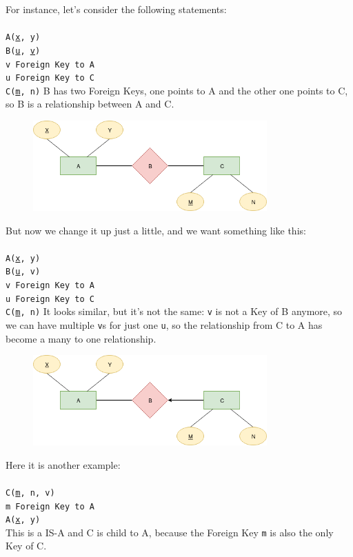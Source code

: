 \documentclass[class=book, crop=false, oneside]{standalone}
\newcommand\tab[1][1cm]{\hspace*{#1}}
\begin{document}
For instance, let's consider the following statements:\\\\
\texttt{A(\underline{x}, y)}\\
\texttt{B(\underline{u}, \underline{v})}\\
\tab[.4cm] \texttt{v Foreign Key to A}\\
\tab[.4cm] \texttt{u Foreign Key to C}\\
\texttt{C(\underline{m}, n)}
\vskip 5pt
B has two Foreign Keys, one points to A and the other one points to C, so B is a relationship between A and C.
\begin{figure}[H]
	\includegraphics[width=0.8\textwidth,keepaspectratio]{diagram3_00.png}
	\caption{}
	\label{diagram3_00}
\end{figure}
\vskip 5pt
But now we change it up just a little, and we want something like this:\\\\
\texttt{A(\underline{x}, y)}\\
\texttt{B(\underline{u}, v)}\\
\tab[.4cm] \texttt{v Foreign Key to A}\\
\tab[.4cm] \texttt{u Foreign Key to C}\\
\texttt{C(\underline{m}, n)}
\vskip 5pt
It looks similar, but it's not the same: \texttt{v} is not a Key of B anymore, so we can have multiple \texttt{v}s for just one \texttt{u}, so the relationship from C to A has become a many to one relationship.
\begin{figure}[H]
	\includegraphics[width=0.8\textwidth,keepaspectratio]{diagram3_01.png}
	\caption{}
	\label{diagram3_01}
\end{figure}
\vskip 5pt
Here it is another example:\\\\
\texttt{C(\underline{m}, n, v)}\\
\tab[.4cm] \texttt{m Foreign Key to A}\\
\texttt{A(\underline{x}, y)}\\
\vskip 5pt
This is a IS-A and C is child to A, because the Foreign Key \texttt{m} is also the only Key of C.
\end{document}
